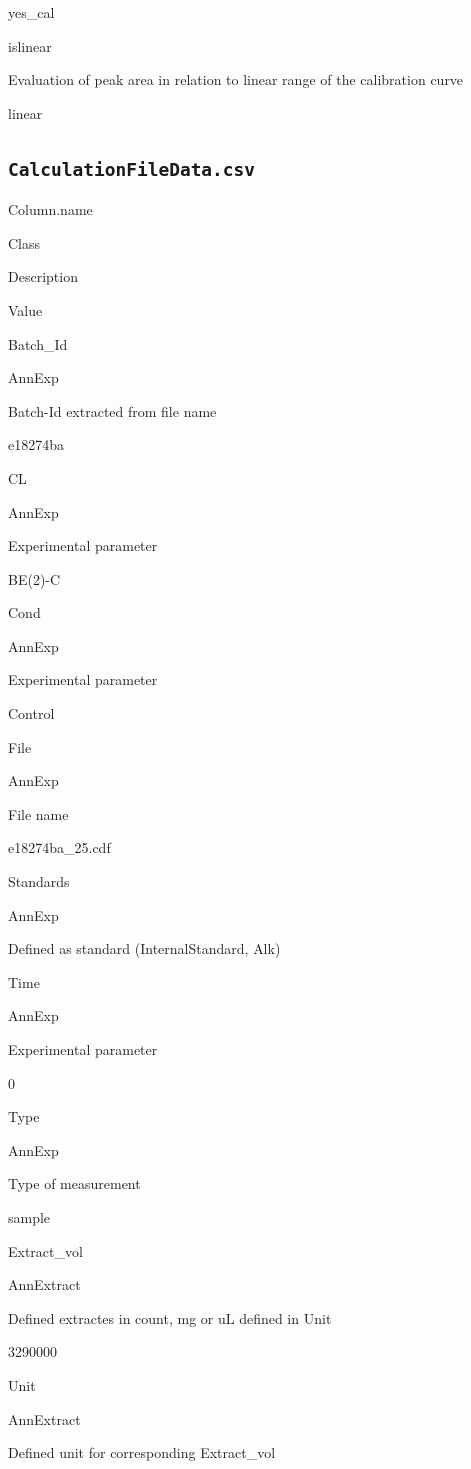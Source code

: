 \documentclass[]{book}
\theoremstyle{definition}
\theoremstyle{definition}
\theoremstyle{definition}
\theoremstyle{remark}
\begin{document}
yes\_cal

islinear

Evaluation of peak area in relation to linear range of the calibration
curve

linear

\subsection{\texorpdfstring{\texttt{CalculationFileData.csv}}{CalculationFileData.csv}}\label{calculationfiledata.csv}

Column.name

Class

Description

Value

Batch\_Id

AnnExp

Batch-Id extracted from file name

e18274ba

CL

AnnExp

Experimental parameter

BE(2)-C

Cond

AnnExp

Experimental parameter

Control

File

AnnExp

File name

e18274ba\_25.cdf

Standards

AnnExp

Defined as standard (InternalStandard, Alk)

Time

AnnExp

Experimental parameter

0

Type

AnnExp

Type of measurement

sample

Extract\_vol

AnnExtract

Defined extractes in count, mg or uL defined in Unit

3290000

Unit

AnnExtract

Defined unit for corresponding Extract\_vol
\end{document}
